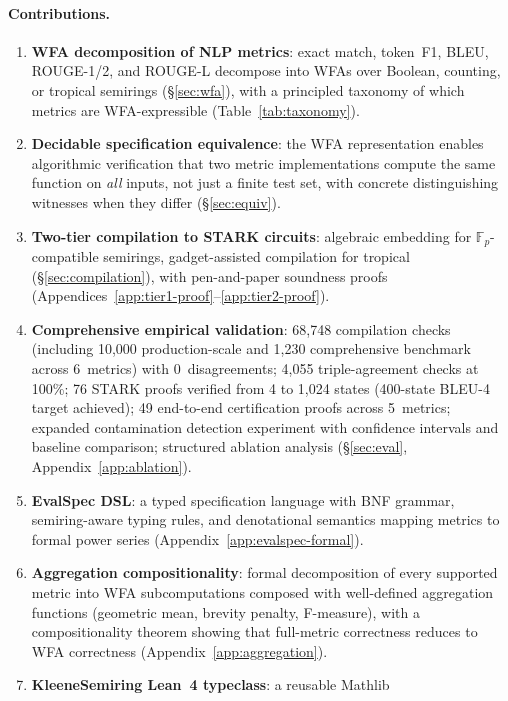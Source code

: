\documentclass[11pt]{article}
\newcommand{\F}{\mathbb{F}}
\begin{document}
\paragraph{Contributions.}
\begin{enumerate}[leftmargin=*,nosep]
\item \textbf{WFA decomposition of NLP metrics}: exact match,
  token~F1, BLEU, ROUGE-1/2, and ROUGE-L decompose into WFAs
  over Boolean, counting, or tropical semirings (\S\ref{sec:wfa}),
  with a principled taxonomy of which metrics are WFA-expressible
  (Table~\ref{tab:taxonomy}).
\item \textbf{Decidable specification equivalence}: the WFA
  representation enables algorithmic verification that two metric
  implementations compute the same function on \emph{all} inputs, not
  just a finite test set, with concrete distinguishing witnesses when
  they differ (\S\ref{sec:equiv}).
\item \textbf{Two-tier compilation to STARK circuits}: algebraic
  embedding for $\F_p$-compatible semirings, gadget-assisted compilation
  for tropical (\S\ref{sec:compilation}), with pen-and-paper soundness proofs
  (Appendices~\ref{app:tier1-proof}--\ref{app:tier2-proof}).
\item \textbf{Comprehensive empirical validation}: 68{,}748 compilation
  checks (including 10{,}000 production-scale and 1{,}230 comprehensive
  benchmark across 6~metrics) with 0~disagreements;
  4{,}055 triple-agreement checks at 100\%;
  76 STARK proofs verified from 4 to 1{,}024 states
  (400-state BLEU-4 target achieved);
  49 end-to-end certification proofs across 5~metrics;
  expanded contamination
  detection experiment with confidence intervals and baseline comparison;
  structured ablation analysis (\S\ref{sec:eval},
  Appendix~\ref{app:ablation}).
\item \textbf{EvalSpec DSL}: a typed specification language with BNF
  grammar, semiring-aware typing rules, and denotational semantics
  mapping metrics to formal power series
  (Appendix~\ref{app:evalspec-formal}).
\item \textbf{Aggregation compositionality}: formal decomposition of
  every supported metric into WFA subcomputations composed with
  well-defined aggregation functions (geometric mean, brevity penalty,
  F-measure), with a compositionality theorem showing that
  full-metric correctness reduces to WFA correctness
  (Appendix~\ref{app:aggregation}).
\item \textbf{KleeneSemiring Lean~4 typeclass}: a reusable Mathlib

\end{enumerate}
\end{document}
